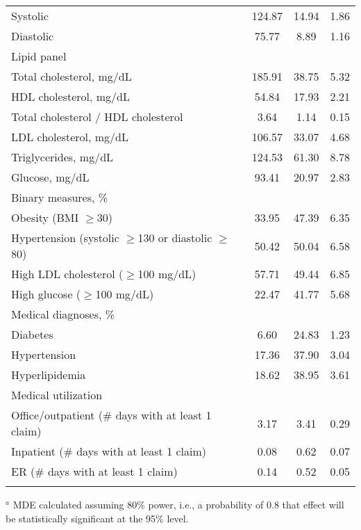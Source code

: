 \documentclass{article}
\begin{document}
\begin{table}[tbp]
{\begin{tabularx}{\linewidth}{lCCC}
\hspace{3em} Systolic&124.87&14.94&1.86 \tabularnewline
\hspace{3em} Diastolic&75.77&8.89&1.16 \tabularnewline
\hspace{2em} Lipid panel&&& \tabularnewline
\hspace{3em} Total cholesterol, mg/dL&185.91&38.75&5.32 \tabularnewline
\hspace{3em} HDL cholesterol, mg/dL&54.84&17.93&2.21 \tabularnewline
\hspace{3em} Total cholesterol / HDL cholesterol&3.64&1.14&0.15 \tabularnewline
\hspace{3em} LDL cholesterol, mg/dL&106.57&33.07&4.68 \tabularnewline
\hspace{3em} Triglycerides, mg/dL&124.53&61.30&8.78 \tabularnewline
\hspace{2em} Glucose, mg/dL&93.41&20.97&2.83 \tabularnewline
\hspace{1em} Binary measures, \%&&& \tabularnewline
\hspace{2em} Obesity (BMI $\geq$30)&33.95&47.39&6.35 \tabularnewline
\hspace{2em} Hypertension (systolic $\geq$130 or diastolic $\geq$80)&50.42&50.04&6.58 \tabularnewline
\hspace{2em} High LDL cholesterol ($\geq$100 mg/dL)&57.71&49.44&6.85 \tabularnewline
\hspace{2em} High glucose ($\geq$100 mg/dL)&22.47&41.77&5.68 \tabularnewline
Medical diagnoses, \%&&& \tabularnewline
\hspace{1em} Diabetes&6.60&24.83&1.23 \tabularnewline
\hspace{1em} Hypertension&17.36&37.90&3.04 \tabularnewline
\hspace{1em} Hyperlipidemia&18.62&38.95&3.61 \tabularnewline
Medical utilization&&& \tabularnewline
\hspace{1em} Office/outpatient (\# days with at least 1 claim)&3.17&3.41&0.29 \tabularnewline
\hspace{1em} Inpatient (\# days with at least 1 claim)&0.08&0.62&0.07 \tabularnewline
\hspace{1em} ER (\# days with at least 1 claim)&0.14&0.52&0.05 \tabularnewline
\bottomrule \addlinespace[\belowrulesep]

\end{tabularx}
\begin{flushleft}
\scriptsize $^{a}$ MDE calculated assuming 80\% power, i.e., a probability of 0.8 that effect will be statistically significant at the 95\% level.
\end{flushleft}
}
\end{table}
\end{document}
